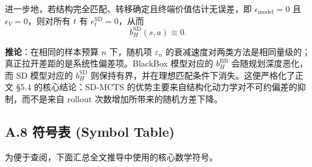 \documentclass[UTF8]{ctexart}
\begin{document}
进一步地，若结构完全匹配、转移确定且终端价值估计无误差，即 \(\epsilon_{\text{model}}=0\) 且 \(\epsilon_V=0\)，则对所有 \(t\) 有 \(e_t^{\mathrm{SD}}=0\)，从而
\[
b_H^{\mathrm{SD}}(s,a)\equiv 0.
\]

\textbf{推论}：在相同的样本预算 \(n\) 下，随机项 \(\varepsilon_n\) 的衰减速度对两类方法是相同量级的；真正拉开差距的是系统性偏差项。BlackBox 模型对应的 \(b_H^{\mathrm{BB}}\) 会随规划深度恶化，而 SD 模型对应的 \(b_H^{\mathrm{SD}}\) 则保持有界，并在理想匹配条件下消失。这便严格化了正文 §5.4 的核心结论：SD-MCTS 的优势主要来自结构化动力学对不可约偏差的抑制，而不是来自 rollout 次数增加所带来的随机方差下降。

\hypertarget{a.8-symbol-table}{%
\subsection{A.8 符号表 (Symbol Table)}\label{a.8-symbol-table}}

为便于查阅，下面汇总全文推导中使用的核心数学符号。
\end{document}
